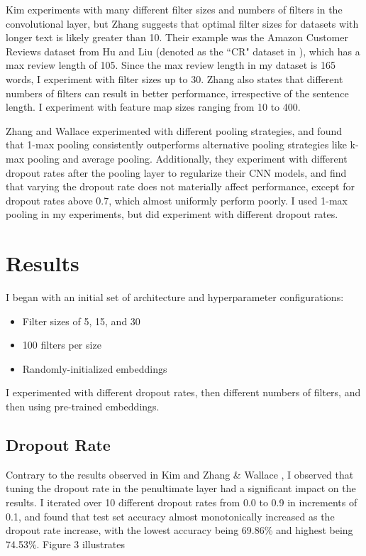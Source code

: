 \documentclass[11pt,a4paper]{article}
\begin{document}
	Kim \cite{Kim} experiments with many different filter sizes and numbers of filters in the convolutional layer, but Zhang \cite{Zhang} suggests that optimal filter sizes for datasets with longer text is likely greater than 10. Their example was the Amazon Customer Reviews dataset from Hu and Liu \cite{Hu} (denoted as the ``CR" dataset in \cite{Zhang}), which has a max review length of 105. Since the max review length in my dataset is 165 words, I experiment with filter sizes up to 30. Zhang \cite{Zhang} also states that different numbers of filters can result in better performance, irrespective of the sentence length. I experiment with feature map sizes ranging from 10 to 400.
	
	Zhang and Wallace \cite{Zhang} experimented with different pooling strategies, and found that 1-max pooling consistently outperforms alternative pooling strategies like k-max pooling and average pooling. Additionally, they experiment with different dropout rates after the pooling layer to regularize their CNN models, and find that varying the dropout rate does not materially affect performance, except for dropout rates above 0.7, which almost uniformly perform poorly. I used 1-max pooling in my experiments, but did experiment with different dropout rates.
	
	\section{Results}
	I began with an initial set of architecture and hyperparameter configurations:
	\begin{itemize}
		\item Filter sizes of 5, 15, and 30
		\item 100 filters per size
		\item Randomly-initialized embeddings
	\end{itemize}
	
	I experimented with different dropout rates, then different numbers of filters, and then using pre-trained embeddings.
	
	\subsection{Dropout Rate}
	Contrary to the results observed in Kim \cite{Kim} and Zhang \& Wallace \cite{Zhang}, I observed that tuning the dropout rate in the penultimate layer had a significant impact on the results. I iterated over 10 different dropout rates from 0.0 to 0.9 in increments of 0.1, and found that test set accuracy almost monotonically increased as the dropout rate increase, with the lowest accuracy being 69.86\% and highest being 74.53\%. Figure 3 illustrates 
	
\end{document}
